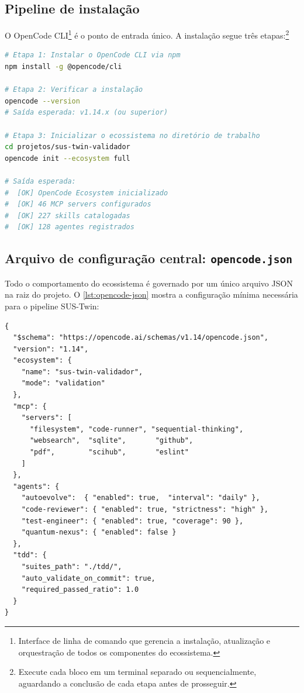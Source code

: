 \subsection{Pipeline de instalação}

O OpenCode CLI\footnote{Interface de linha de comando que gerencia a instalação,
atualização e orquestração de todos os componentes do ecossistema.} é o ponto
de entrada único. A instalação segue três etapas:\footnote{Execute cada bloco
em um terminal separado ou sequencialmente, aguardando a conclusão de cada
etapa antes de prosseguir.}

\begin{lstlisting}[language=bash, caption={Instalação completa do OpenCode Ecosystem},
label={lst:opencode-install}, style=bashstyle]
# Etapa 1: Instalar o OpenCode CLI via npm
npm install -g @opencode/cli

# Etapa 2: Verificar a instalação
opencode --version
# Saída esperada: v1.14.x (ou superior)

# Etapa 3: Inicializar o ecossistema no diretório de trabalho
cd projetos/sus-twin-validador
opencode init --ecosystem full

# Saída esperada:
#  [OK] OpenCode Ecosystem inicializado
#  [OK] 46 MCP servers configurados
#  [OK] 227 skills catalogadas
#  [OK] 128 agentes registrados
\end{lstlisting}

\subsection{Arquivo de configuração central: \texttt{opencode.json}}

Todo o comportamento do ecossistema é governado por um único arquivo JSON
na raiz do projeto. O \autoref{lst:opencode-json} mostra a configuração
mínima necessária para o pipeline SUS-Twin:

\begin{lstlisting}[basicstyle=\ttfamily\scriptsize, caption={Configuração mínima do OpenCode para validação SUS-Twin},
label={lst:opencode-json}]
{
  "$schema": "https://opencode.ai/schemas/v1.14/opencode.json",
  "version": "1.14",
  "ecosystem": {
    "name": "sus-twin-validador",
    "mode": "validation"
  },
  "mcp": {
    "servers": [
      "filesystem", "code-runner", "sequential-thinking",
      "websearch",  "sqlite",       "github",
      "pdf",        "scihub",       "eslint"
    ]
  },
  "agents": {
    "autoevolve":  { "enabled": true,  "interval": "daily" },
    "code-reviewer": { "enabled": true, "strictness": "high" },
    "test-engineer": { "enabled": true, "coverage": 90 },
    "quantum-nexus": { "enabled": false }
  },
  "tdd": {
    "suites_path": "./tdd/",
    "auto_validate_on_commit": true,
    "required_passed_ratio": 1.0
  }
}
\end{lstlisting}

